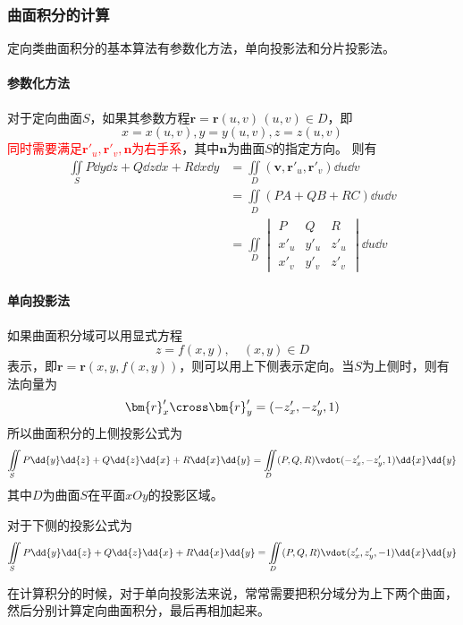 \subsubsection{曲面积分的计算}
定向类曲面积分的基本算法有参数化方法，单向投影法和分片投影法。
\paragraph{参数化方法}
对于定向曲面$S$，如果其参数方程$\bm{r}=\bm{r}(u,v)\,(u,v)\in D$，即
\[ x=x(u,v),y=y(u,v),z=z(u,v) \]
\textcolor{red}{同时需要满足$\bm{r}'_u,\bm{r}'_v,\bm{n}$为右手系}，其中$\bm{n}$为曲面$S$的指定方向。
则有
\begin{align*}
    \iint\limits_S P\dd{y}\dd{z} + Q\dd{z}\dd{x} + R\dd{x}\dd{y}
     & = \iint\limits_D (\bm{v},\bm{r}'_u, \bm{r}'_v) \dd{u}\dd{v} \\
     & = \iint\limits_D (PA+QB+RC)\dd{u}\dd{v}                     \\
     & = \iint\limits_D
    \begin{vmatrix}
        P    & Q    & R    \\
        x'_u & y'_u & z'_u \\
        x'_v & y'_v & z'_v
    \end{vmatrix}
    \dd{u}\dd{v}
\end{align*}

\paragraph{单向投影法}
如果曲面积分域可以用显式方程
\[ z=f(x,y),\quad (x,y)\in D \]
表示，即$\bm{r} = \bm{r}(x,y,f(x,y))$，则可以用上下侧表示定向。当$S$为上侧时，则有法向量为
\[ \bm{r}'_x\cross\bm{r}'_y = (-z'_x, -z'_y, 1) \]
所以曲面积分的上侧投影公式为
\begin{equation}
    \iint\limits_S P\dd{y}\dd{z} + Q\dd{z}\dd{x} + R\dd{x}\dd{y} = \iint\limits_D (P,Q,R)\vdot(-z'_x,-z'_y,1)\dd{x}\dd{y}
\end{equation}
其中$D$为曲面$S$在平面$xOy$的投影区域。

对于下侧的投影公式为
\begin{equation}
    \iint\limits_S P\dd{y}\dd{z} + Q\dd{z}\dd{x} + R\dd{x}\dd{y} = \iint\limits_D (P,Q,R)\vdot(z'_x,z'_y,-1)\dd{x}\dd{y}
\end{equation}

在计算积分的时候，对于单向投影法来说，常常需要把积分域分为上下两个曲面，然后分别计算定向曲面积分，最后再相加起来。

